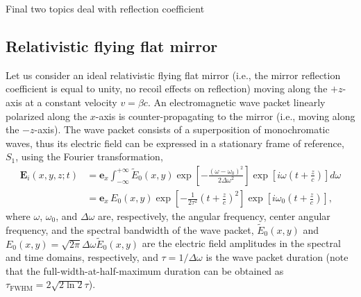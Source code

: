 \documentclass[10pt, a4paper, twoside, openright]{report}
\renewcommand{\vec}[1]{\mathbf{#1}}
\begin{document}
Final two topics deal with reflection coefficient


\subsection{Relativistic flying flat mirror}


Let us consider an ideal relativistic flying flat mirror (i.e., the mirror reflection coefficient is equal to unity, no recoil effects on reflection) moving along the $ +z $-axis at a constant velocity $ v = \beta c $. An electromagnetic wave packet linearly polarized along the $ x $-axis is counter-propagating to the mirror (i.e., moving along the $ -z $-axis). The wave packet consists of a superposition of monochromatic waves, thus its electric field can be expressed in a stationary frame of reference, $ S_1 $, using the Fourier transformation,
\begin{equation}\label{eq:incident_lab_frame_1}
\begin{split}
\vec{E}_i \left(x, y, z; t \right) &= \vec{e}_x \int_{-\infty}^{+\infty} \tilde{E}_0 \left(x, y \right) \exp \left[ -\frac{\left( \omega - \omega_0 \right)^2}{2 \Delta \omega^2} \right] \exp \left[ i \omega \left(t + \frac{z}{c}\right) \right] d \omega \\
&= \vec{e}_x \, E_0 \left(x, y \right) \exp \left[ - \frac{1}{2 \tau^2} \left(t + \frac{z}{c}\right)^2 \right] \exp \left[ i \omega_0 \left(t + \frac{z}{c}\right) \right],
\end{split}
\end{equation}
where $ \omega $, $ \omega_0 $, and $ \Delta \omega $ are, respectively, the angular frequency, center angular frequency, and the spectral bandwidth of the wave packet, $ \tilde{E}_0 \left(x, y \right) $ and $ E_0 \left(x, y \right) = \sqrt{2 \pi} \Delta \omega \tilde{E}_0 \left(x, y \right) $ are the electric field amplitudes in the spectral and time domains, respectively, and $ \tau = 1 / \Delta \omega $ is the wave packet duration (note that the full-width-at-half-maximum duration can be obtained as $ \tau_{\mathrm{FWHM}} = 2 \sqrt{2 \ln 2} \tau $).

\end{document}
